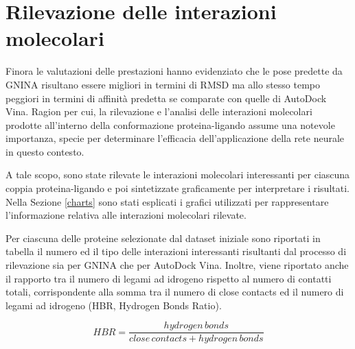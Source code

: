 \section{Rilevazione delle interazioni molecolari}
Finora le valutazioni delle prestazioni hanno evidenziato che le pose predette da GNINA risultano essere migliori in termini di RMSD  ma allo stesso tempo peggiori in termini di affinità predetta se comparate con quelle di AutoDock Vina. Ragion per cui, la rilevazione e l'analisi delle interazioni molecolari prodotte all'interno della conformazione proteina-ligando assume una notevole importanza, specie per determinare l'efficacia dell'applicazione della rete neurale in questo contesto.

A tale scopo, sono state rilevate le interazioni molecolari interessanti per ciascuna coppia proteina-ligando e poi sintetizzate graficamente per interpretare i risultati.
Nella Sezione \ref{charts} sono stati esplicati i grafici utilizzati per rappresentare l'informazione relativa alle interazioni molecolari rilevate. 

Per ciascuna delle proteine selezionate dal dataset iniziale sono riportati in tabella il numero ed il tipo delle interazioni interessanti risultanti dal processo di rilevazione sia per GNINA che per AutoDock Vina. Inoltre, viene riportato anche il rapporto tra il numero di legami ad idrogeno rispetto al numero di contatti totali, corrispondente alla somma tra il numero di close contacts ed il numero di legami ad idrogeno (HBR, Hydrogen Bonds Ratio).

\begin{equation} \label{eq:hbr}
    HBR = \frac{hydrogen\,bonds}{close\,contacts + hydrogen\,bonds}
\end{equation}


